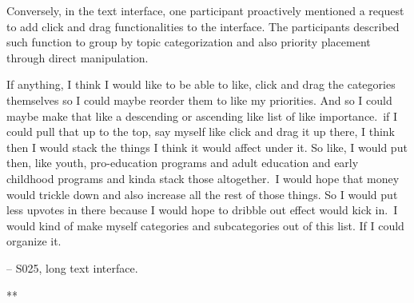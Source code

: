 Conversely, in the text interface, one participant proactively mentioned a request to add click and drag functionalities to the interface. The participants described such function to group by topic categorization and also priority placement through direct manipulation. 

\begin{displayquote}
If anything, I think I would like to be able to like, click and drag the categories themselves so I could maybe reorder them to like my priorities. And so I could maybe make that like a descending or ascending like list of like importance.~\bracketellipsis if I could pull that up to the top, say myself like click and drag it up there, I think then I would stack the things I think it would affect under it. So like, I would put then, like youth, pro-education programs and adult education and early childhood programs and kinda stack those altogether.~\bracketellipsis I would hope that money would trickle down and also increase all the rest of those things. So I would put less upvotes in there because I would hope to dribble out effect would kick in.~\bracketellipsis I would kind of make myself categories and subcategories out of this list. If I could organize it.

\noindent \hfill -- S025, long text interface.
\end{displayquote}


**



